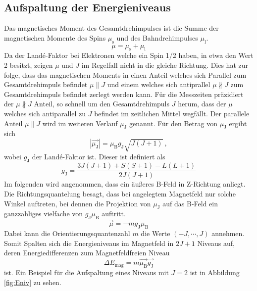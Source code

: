 \subsection{Aufspaltung der Energieniveaus}
Das magnetisches Moment des Gesamtdrehimpulses ist die Summe der magnetischen Momente des Spins $\mu_\text{s}$ und des Bahndrehimpulses $\mu_\text{l}$.
\begin{equation}
  \mu = \mu_\text{s} + \mu_\text{l}
\end{equation}
Da der Landé-Faktor bei Elektronen welche ein Spin 1/2 haben, in etwa den Wert 2 besitzt, zeigen $\mu$ und $J$ im Regelfall nicht in die gleiche Richtung. Dies hat zur folge, dass das magnetischen Moments in einen Anteil welches sich Parallel zum Gesamtdrehimpuls befindet $\mu \parallel J$ und einem welches sich antiprallel $\mu \nparallel J$ zum Gesamtdrehimpuls befindet zerlegt werden kann. Für die Messzeiten präzidiert der  $\mu \nparallel J$ Anteil, so schnell um den Gesamtdrehimpuls $J$ herum, dass der $\mu$ welches sich antiparallel zu $J$ befindet im zeitlichen Mittel wegfällt. Der parallele Anteil $\mu \parallel J$ wird im weiteren Verlauf $\mu_\text{J}$ genannt. Für den Betrag von $\mu_\text{J}$ ergibt sich
\begin{equation}
  |\vec{\mu_\text{J}}| = \mu_\text{B} g_\text{J} \sqrt{J(J+1)} \ ,
  \label{eqn:muJ}
\end{equation}
wobei $g_\text{J}$ der Landé-Faktor ist. Dieser ist definiert als
\begin{equation}
  g_\text{J} = \frac{3J(J+1) + S(S+1) -L(L+1)}{2J(J+1)}
  \label{eqn:Lan}
\end{equation}
Im folgenden wird angenommen, dass ein äußeres B-Feld in Z-Richtung anliegt. Die Richtungsquantelung besagt, dass bei angelegtem Magnetfeld nur solche Winkel auftreten, bei dennen die Projektion von $\mu_\text{J}$ auf das B-Feld ein ganzzahliges vielfache von $g_\text{J} \mu_\text{B}$ auftritt.
\begin{equation}
  \vec{\mu} = -m g_\text{J} \mu_\text{B}
  \label{eqn:mu}
\end{equation}
Dabei kann die Orientierungsquantenzahl $m$ die Werte $(-J, \cdots, J)$ annehmen. Somit Spalten sich die Energieniveaus im Magnetfeld in $2J+1$ Niveaus auf, deren Energiedifferenzen zum Magnetfeldfreien Niveau
\begin{equation}
	\Delta E_\text{mag} = m \vec{\mu_\text{B}} \vec{g_\text{J}}
  \label{eqn:delE}
\end{equation}
ist. Ein Beispiel für die Aufspaltung eines Niveaus mit $J=2$ ist in Abbildung \ref{fig:Eniv} zu sehen.
